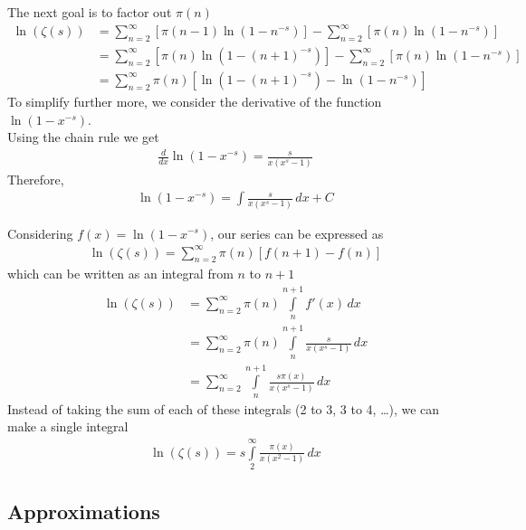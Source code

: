 \documentclass[a4paper]{article}
\begin{document}
The next goal is to factor out \(\pi (n)\)
\begin{align*}
    \ln\left(\zeta(s)\right)
    &=\sum_{n=2}^{\infty}\left[\pi (n-1)\ln\left(1-n^{-s}\right)\right]
    -\sum_{n=2}^{\infty}\left[\pi (n)\ln\left(1-n^{-s}\right)\right]
    \\&=\sum_{n=2}^{\infty}\left[\pi (n)\ln\left(1-{(n+1)}^{-s}\right)\right]
    -\sum_{n=2}^{\infty}\left[\pi (n)\ln\left(1-n^{-s}\right)\right]
    \\
    &=\sum_{n=2}^{\infty}\pi (n)\left[\ln\left(1-{(n+1)}^{-s}\right)-\ln\left(1-n^{-s}\right)\right]
\end{align*}
To simplify further more, we consider the derivative of the function \(\ln(1-x^{-s})\).
\\
Using the chain rule we get
\begin{align*}
    \frac{d}{dx}\ln\left(1-x^{-s}\right)=
    \frac{s}{x(x^s-1)}
\end{align*}
Therefore,
\begin{align*}
    \ln\left(1-x^{-s}\right)=
    \int \frac{s}{x(x^s-1)}\,dx+C
\end{align*}

Considering \(f(x)=\ln(1-x^{-s})\), our series can be expressed as
\begin{align*}
    \ln\left(\zeta(s)\right)=
    \sum_{n=2}^{\infty}\pi(n)\left[f(n+1)-f(n)\right]
\end{align*}
which can be written as an integral from \(n\) to \(n+1\)
\begin{align*}
    \ln\left(\zeta(s)\right)&=
    \sum_{n=2}^{\infty}\pi(n)
    \int\limits_n^{n+1} f'(x)\,dx
    \\
    &=
    \sum_{n=2}^{\infty}\pi(n)
    \int\limits_n^{n+1}
    \frac{s}{x(x^s-1)}\,dx
    \\
    &=
    \sum_{n=2}^{\infty}
    \int\limits_n^{n+1}
    \frac{s\pi(x)}{x(x^s-1)}\,dx
\end{align*}
Instead of taking the sum of each of these integrals (2 to 3, 3 to 4, \ldots), we can make a single integral
\begin{align*}
    \ln\left(\zeta(s)\right)=
    s\int\limits_2^\infty
    \frac{\pi(x)}{x(x^2-1)}\,dx
\end{align*}

\pagebreak

\subsection{Approximations}
\end{document}
